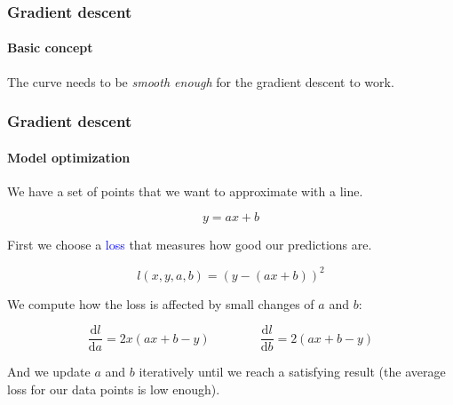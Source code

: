 \documentclass[9pt]{beamer}
\begin{document}
\begin{frame}
  \frametitle{Gradient descent}

  \framesubtitle{Basic concept}

  \begin{center}
    \scalebox{0.8}{
      
    }
  \end{center}

  The curve needs to be \textit{smooth enough} for the gradient
  descent to work.

\end{frame}

\begin{frame}
  \frametitle{Gradient descent}

  \framesubtitle{Model optimization}

  \begin{center}
    \scalebox{0.5}{
      
    }
  \end{center}

  We have a set of points that we want to approximate with a line.

  \[
  y = ax + b
  \]

  \pause

  First we choose a \textcolor{blue}{loss} that measures how good our
  predictions are.

  \[
  l(x, y, a, b) = (y - (a x + b))^{2}
  \]

  \pause

  We compute how the loss is affected by small changes of $a$ and
  $b$:

  \[
  \frac{\mathrm{d}l}{\mathrm{d}a} = 2 x (ax + b - y) \qquad \qquad \frac{\mathrm{d}l}{\mathrm{d}b} = 2 (ax + b - y)
  \]

  And we update $a$ and $b$ iteratively until we reach a satisfying
  result (the average loss for our data points is low enough).

\end{frame}
\end{document}
